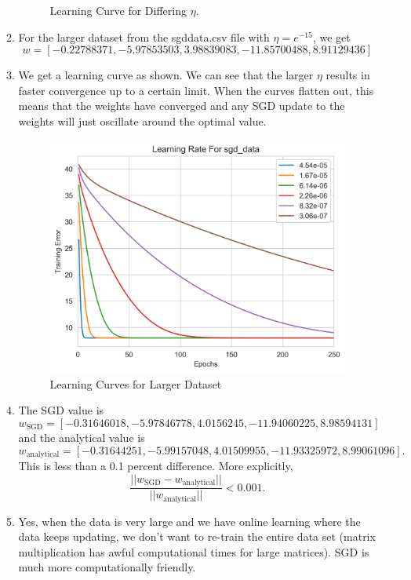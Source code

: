 \documentclass[12pt]{article}
\begin{document}
\begin{enumerate}[leftmargin=*]
\begin{enumerate}[label = \Alph*.]
\begin{figure}[h!]
\caption{Learning Curve for Differing $\eta$.} \label{etalearning}
\end{figure}
\item For the larger dataset from the sgd\text{\textunderscore}data.csv file with $\eta = e^{-15}$, we get
\[ w = [-0.22788371, -5.97853503, 3.98839083, -11.85700488, 8.91129436] \] 
\item We get a learning curve as shown. We can see that the larger $\eta$ results in faster convergence up to a certain limit. When the curves flatten out, this means that the weights have converged and any SGD update to the weights will just oscillate around the optimal value.
\begin{figure}[h!]
\centering
\includegraphics[scale=0.75]{epochlearning2.png}
\caption{Learning Curves for Larger Dataset} \label{etalearning2}
\end{figure}
\item The SGD value is
\[ w_{\text{SGD}} = [-0.31646018, -5.97846778, 4.0156245, -11.94060225, 8.98594131] \]
and the analytical value is
\[ w_{\text{analytical}} = [-0.31644251, -5.99157048, 4.01509955, -11.93325972, 8.99061096]. \]
This is less than a 0.1 percent difference. More explicitly,
\[ \frac{||w_{\text{SGD}} - w_{\text{analytical}}||}{||w_{\text{analytical}}||} < 0.001. \]
\item Yes, when the data is very large and we have online learning where the data keeps updating, we don't want to re-train the entire data set (matrix multiplication has awful computational times for large matrices). SGD is much more computationally friendly.

\end{enumerate}
\end{enumerate}
\end{document}

